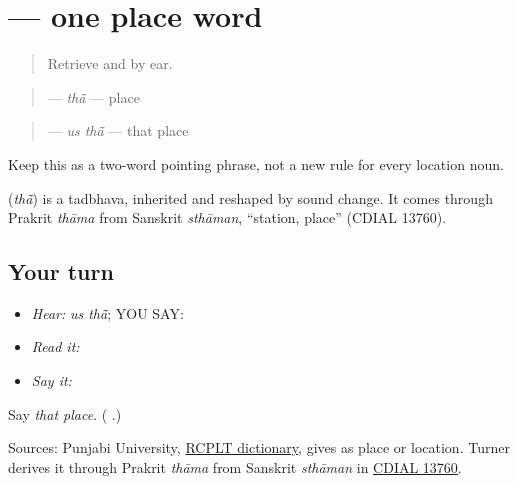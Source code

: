 \section[\texorpdfstring{\pa{ਥਾਂ} (thaan)}{ਥਾਂ (thaan)}]{ — one place word}

\label{lesson:PA-C180-thaan}



\begin{quote}
Retrieve \textbf{} and \textbf{} by ear.
\end{quote}

\begin{grammarlens}[title={Grammar Lens: one location noun}]
\begin{quote}
\textbf{} — \emph{thā̃} — place
\end{quote}

\begin{quote}
\textbf{ } — \emph{us thā̃} — that place
\end{quote}

Keep this as a two-word pointing phrase, not a new rule for every location noun.
\end{grammarlens}

\begin{cousinweb}
\textbf{} (\emph{thā̃}) is a tadbhava, inherited and reshaped by sound change. It comes through Prakrit \emph{thāma} from Sanskrit \emph{sthāman}, \textquotedblleft{}station, place\textquotedblright{} (CDIAL 13760).
\end{cousinweb}

\subsection*{Your turn}
\begin{itemize}
\raggedright
  \item \emph{Hear:} \emph{us thā̃}; YOU SAY: \textbf{ }
  \item \emph{Read it:} \textbf{ }
  \item \emph{Say it:} \textbf{}
\end{itemize}

\begin{tcolorbox}[breakable,colback=teal!4,colframe=teal!35!black,title={Before you move on}]
Say \emph{that place}. (\textbf{ }.)

Sources: Punjabi University, \href{https://dic.learnpunjabi.org/default.aspx?look=\%E0\%A8\%A5\%E0\%A8\%BE\%E0\%A8\%82}{RCPLT dictionary}, gives \textbf{} as place or location. Turner derives it through Prakrit \emph{thāma} from Sanskrit \emph{sthāman} in \href{https://dsal.uchicago.edu/dictionaries/soas/}{CDIAL 13760}.
\end{tcolorbox}
